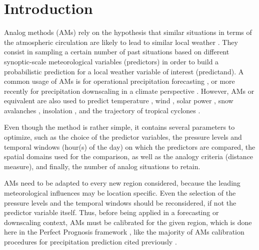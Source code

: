 \documentclass{ametsoc}
\begin{document}


\section{Introduction}
\label{sec:intro}

Analog methods (AMs) rely on the hypothesis that similar situations in terms of the atmospheric circulation are likely to lead to similar local weather \citep{Lorenz1956, Lorenz1969, Duband1970, Bontron2005}. They consist in sampling a certain number of past situations based on different synoptic-scale meteorological variables (predictors) in order to build a probabilistic prediction for a local weather variable of interest (predictand). A common usage of AMs is for operational precipitation forecasting \citep[e.g.,][]{Guilbaud1997, Bontron2005, Hamill2006, Bliefernicht2010, Marty2012, Horton2012, Hamill2015b, BenDaoud2016}, or more recently for precipitation downscaling in a climate perspective \citep[e.g.,][]{Radanovics2013, Chardon2014, Dayon2015}. However, AMs or equivalent are also used to predict temperature \citep{Radinovic1975, Woodcock1980, Kruizinga1983, DelleMonache2013, Caillouet2016}, wind \citep{Gordon1987, DelleMonache2013, DelleMonache2011, Vanvyve2015, Alessandrini2015, Junk2015, Junk2015c}, solar power \citep{Alessandrini2015a, Bessa2015}, snow avalanches \citep{Obled1980, Bolognesi1993}, insolation \citep{Bois1981}, and the trajectory of tropical cyclones \citep{Keenan1981, Sievers2000, Fraedrich2003}.

Even though the method is rather simple, it contains several parameters to optimize, such as the choice of the predictor variables, the pressure levels and temporal windows (hour(s) of the day) on which the predictors are compared, the spatial domains used for the comparison, as well as the analogy criteria (distance measure), and finally, the number of analog situations to retain. 

AMs need to be adapted to every new region considered, because the leading meteorological influences may be location specific. Even the selection of the pressure levels and the temporal windows should be reconsidered, if not the predictor variable itself. Thus, before being applied in a forecasting or downscaling context, AMs must be calibrated for the given region, which is done here in the Perfect Prognosis framework \citep{Klein1963}, like the majority of AMs calibration procedures for precipitation prediction cited previously \cite[with the exception of][]{Hamill2006,Hamill2015b}.
\end{document}
